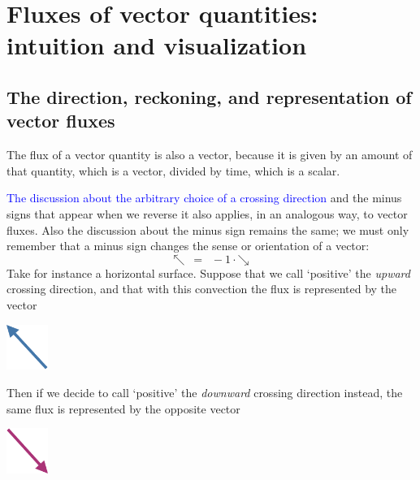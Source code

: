 \documentclass[a4paper,12pt,%
onecolumn,oneside,titlepage,%
british%
]{memoir}
\renewcommand*{\|}[1][]{\nonscript\:#1\vert\nonscript\:\mathopen{}}
\newcommand*{\sect}{\S}%
\renewcommand*{\autoref}[2]{\sidepar{\vspace{-1ex}\footnotesize{\color{blue}\faIcon{hand-point-right}\enspace\sect\,\ref{#1} p.\,\pageref{#1}}}\textcolor{blue}{#2}}
\begin{document}
\section{Fluxes of vector quantities: intuition and visualization}
\label{sec:intuition_fluxes_vector}

\subsection{The direction, reckoning, and representation of vector fluxes}
\label{sec:flux_vector_direction}

The flux of a vector quantity is also a vector, because it is given by an amount of that quantity, which is a vector, divided by time, which is a scalar.

\autoref{sec:flux_scalar_direction}{The discussion about the arbitrary choice of a crossing direction} and the minus signs that appear when we reverse it also applies, in an analogous way, to vector fluxes. Also the discussion about the minus sign remains the same; we must only remember that a minus sign changes the sense or orientation of a vector:
\begin{equation*}
  \mathord{\nwarrow} \mathrel{\enspace=\enspace} -1\cdot\mathord{\searrow}
\end{equation*}
Take for instance a horizontal surface. Suppose that we call \enquote*{positive} the \emph{upward} crossing direction, and that with this convection the flux is represented by the vector
\begin{center}
  \includegraphics[height=4em]{vec_NW.pdf}
\end{center}
Then if we decide to call \enquote*{positive} the \emph{downward} crossing direction instead, the same flux is represented by the opposite vector
\begin{center}
  \includegraphics[height=4em]{vec_SE.pdf}
\end{center}
\end{document}
